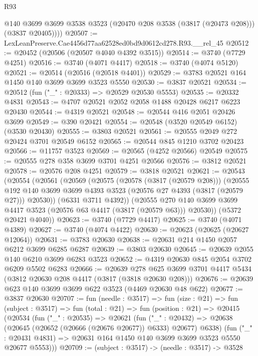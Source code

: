 \begin{lexlean}{R93}
\begin{coremodule}
          @140
          @3699
          @3699
          @3538
          @3523
          (@20470 @208 @3538 (@3817 (@20473 @208)))
          (@3837 @20405))))
@20507 := LexLeanPreserve.Cae4456d77aa62528ed0bd9d0612cd278.R93.__rel_45
@20512 := @20452 (@20506 (@20507 @4040 @4392 @3515))
@20514 := @3740 (@7729 @4251)
@20516 := @3740 (@4071 @4417)
@20518 := @3740 (@4074 @5120)
@20521 := @20514 (@20516 (@20518 @4401))
@20529 := @3783 @20521 @164 @1450 @140 @3699 @3699 @3523 @5550
@20530 := @3837 @20521
@20534 := @20512 (fun ("_" : @20333) => @20529 @20530 @5553)
@20535 := @20332 @4831
@20543 := @4707 @20521 @2052 @2058 @1488 @20428 @6217 @6223 @20430
@20544 := @4319 @20521
@20548 := @20544 @416 @2051 @20426 @3699
@20549 := @390 @20421
@20554 := @20548 (@3520 @20549 @6152) (@3530 @20430)
@20555 := @3803 @20521
@20561 := @20555 @2049 @272 @20424 @3701 @20549 @6152
@20565 := @20544 @845 @1210 @3702 @20423
@20566 := @11757 @3523
@20569 := @20565 (@4252 @20566) @20549
@20575 := @20555 @278 @358 @3699 @3701 @4251 @20566
@20576 := @3812 @20521
@20578 := @20576 @208 @4251
@20579 := @3818 @20521
@20621 := @20543
    (@20554
      (@20561
        (@20569
          (@20575
            (@20578 (@3817 (@20579 @208)))
            (@20555
              @192
              @140
              @3699
              @3699
              @4393
              @3523
              (@20576 @27 @4393 (@3817 (@20579 @27)))
              @20530))
          (@6331 @3711 @4392))
        (@20555 @270 @140 @3699 @3699 @4417 @3523 (@20576 @63 @4417 (@3817 (@20579 @63))) @20530))
      (@5372 @20421 @4040))
@20623 := @3740 (@7729 @4417)
@20625 := @3740 (@4071 @4389)
@20627 := @3740 (@4074 @4422)
@20630 := @20623 (@20625 (@20627 @12064))
@20631 := @3783 @20630
@20638 := @20631 @214 @1450 @2057 @6212 @3699 @6285 @6287
@20639 := @3803 @20630
@20645 := @20639 @2055 @140 @6210 @3699 @6283 @3523
@20652 := @4319 @20630 @845 @2054 @3702 @6209 @5502 @6283
@20666 := @20639
    @278
    @625
    @3699
    @3701
    @4417
    @5434
    (@3812 @20630 @208 @4417 (@3817 (@3818 @20630 @208)))
@20676 := @20639 @623 @140 @3699 @3699 @622 @3523 (@4469 @20630 @48 @622)
@20677 := @3837 @20630
@20707 := fun (needle : @3517) =>
  fun (size : @21) =>
  fun (subject : @3517) =>
  fun (total : @21) =>
  fun (position : @21) =>
  @20415
    (@20534
      (fun ("_" : @20535) =>
      @20621
        (fun ("_" : @20432) => @20638 (@20645 (@20652 (@20666 (@20676 @20677)) @6333) @20677) @6338)
        (fun ("_" : @20431 @4831) => @20631 @164 @1450 @140 @3699 @3699 @3523 @5550 @20677 @5553)))
@20709 := (subject : @3517) -> (needle : @3517) -> @3528

\end{coremodule}
\end{lexlean}
